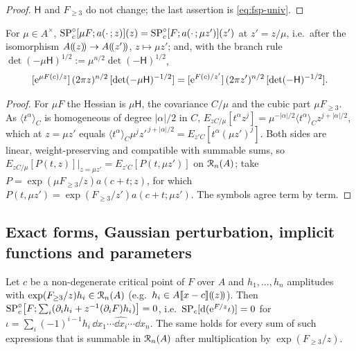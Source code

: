 \begin{proof}
$\mathsf H$ and $F_{\geq3}$ do not change; the last assertion is \eqref{eq:fsp-univ}.
\end{proof}

\begin{lem}[Homogeneity]
\label{lem:fsp-homog}
For $\mu\in A^\times$, $\mathrm{SP}^{\circ}_c[\mu F;a(\cdot\,;z)](z)=\mathrm{SP}^{\circ}_c[F;a(\cdot\,;\mu z')](z')$ at $z'=z/\mu$, i.e.\ after the isomorphism $A(\!(z)\!)\to A(\!(z')\!)$, $z\mapsto\mu z'$; and, with the branch rule $\det(-\mu\mathsf H)^{1/2}:=\mu^{n/2}\det(-\mathsf H)^{1/2}$,
\[
[\mathrm{e}^{\mu F(c)/z}]\,(2\pi z)^{n/2}\,[\det(-\mu\mathsf H)^{-1/2}]=[\mathrm{e}^{F(c)/z'}]\,(2\pi z')^{n/2}\,[\det(-\mathsf H)^{-1/2}].
\]
\end{lem}

\begin{proof}
For $\mu F$ the Hessian is $\mu\mathsf H$, the covariance $C/\mu$ and the cubic part $\mu F_{\geq3}$. As $\langle t^\alpha\rangle_C$ is homogeneous of degree $|\alpha|/2$ in $C$, $E_{zC/\mu}[t^\alpha z^j]=\mu^{-|\alpha|/2}\langle t^\alpha\rangle_Cz^{j+|\alpha|/2}$, which at $z=\mu z'$ equals $\langle t^\alpha\rangle_C\mu^jz'^{\,j+|\alpha|/2}=E_{z'C}[t^\alpha(\mu z')^j]$. Both sides are linear, weight-preserving and compatible with summable sums, so $E_{zC/\mu}[P(t,z)]|_{z=\mu z'}=E_{z'C}[P(t,\mu z')]$ on $\mathcal{R}_n(A)$; take $P=\exp(\mu F_{\geq3}/z)a(c+t;z)$, for which $P(t,\mu z')=\exp(F_{\geq3}/z')a(c+t;\mu z')$. The symbols agree term by term.
\end{proof}

\subsection{Exact forms, Gaussian perturbation, implicit functions and parameters}
\label{sec:fsp-basic}

\begin{lem}
\label{lem:fsp-ibp}
Let $c$ be a non-degenerate critical point of $F$ over $A$ and $h_1,\dots,h_n$ amplitudes with $\exp(F_{\geq3}/z)h_i\in\mathcal{R}_n(A)$ (e.g.\ $h_i\in A[\![ x-c ]\!](\!(z)\!)$). Then $\mathrm{SP}^{\circ}_c\bigl[F;\sum_i(\partial_ih_i+z^{-1}(\partial_iF)h_i)\bigr]=0$, i.e.\ $\mathrm{SP}_c[\mathrm{d}(\mathrm{e}^{F/z}\iota)]=0$ for $\iota=\sum_i(-1)^{i-1}h_i\,\dd x_1\cdots\widehat{\dd x_i}\cdots\dd x_n$. The same holds for every sum of such expressions that is summable in $\mathcal{R}_n(A)$ after multiplication by $\exp(F_{\geq3}/z)$.
\end{lem}

